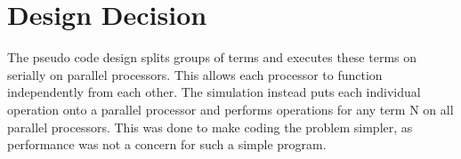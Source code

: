\section{Design Decision}
The pseudo code design splits groups of terms and executes these terms on serially on parallel processors. This allows each processor to function independently from each other. The simulation instead puts each individual operation onto a parallel processor and performs operations for any term N on all parallel processors. This was done to make coding the problem simpler, as performance was not a concern for such a simple program.